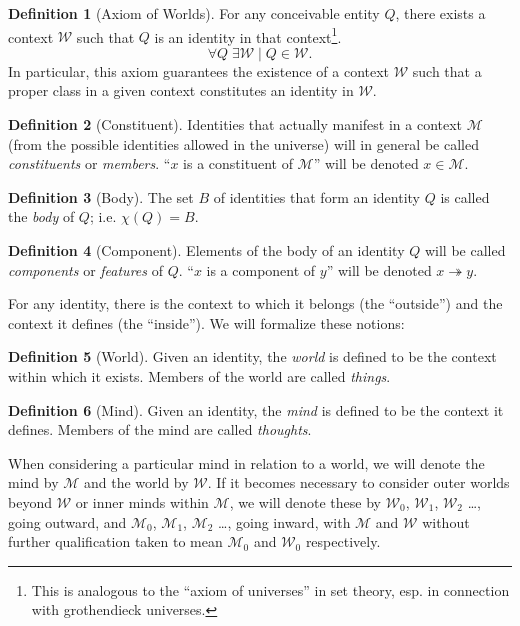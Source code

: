 \documentclass[pra,twocolumn,groupedaddress,10pt]{revtex4}
\theoremstyle{definition}
\newtheorem{defn}{Definition}[section]
\begin{document}
\begin{defn}[Axiom of Worlds]
	For any conceivable entity $Q$, there exists a context $\mathcal{W}$ such that $Q$ is an identity in that context\footnote{This is analogous to the ``axiom of universes''\cite{maclane} in set theory, esp. in connection with grothendieck universes.}.
	\begin{equation}
		\forall Q \; \exists \mathcal{W} \mid Q \in \mathcal{W}. \nonumber
	\end{equation}
	In particular, this axiom guarantees the existence of a context $\mathcal{W}$ such that a proper class in a given context constitutes an identity in $\mathcal{W}$.
\end{defn}

\begin{defn}[Constituent]
	Identities that actually manifest in a context $\mathcal{M}$ (from the possible identities allowed in the universe) will in general be called \emph{constituents} or \emph{members}. ``$x$ is a constituent of $\mathcal{M}$'' will be denoted $x \in \mathcal{M}$.
\end{defn}

\begin{defn}[Body]
	The set $B$ of identities that form an identity $Q$ is called the \emph{body} of $Q$; i.e. $\chi(Q) = B$.
\end{defn}

\begin{defn}[Component]
	Elements of the body of an identity $Q$ will be called \emph{components} or \emph{features} of $Q$. ``$x$ is a component of $y$'' will be denoted $x \twoheadrightarrow y$.
\end{defn}

For any identity, there is the context to which it belongs (the ``outside'') and the context it defines (the ``inside''). We will formalize these notions:

\begin{defn}[World]
	Given an identity, the \emph{world} is defined to be the context within which it exists. Members of the world are called \emph{things}.
\end{defn}

\begin{defn}[Mind]
	Given an identity, the \emph{mind} is defined to be the context it defines. Members of the mind are called \emph{thoughts}.
\end{defn}

When considering a particular mind in relation to a world, we will denote the mind by $\mathcal{M}$ and the world by $\mathcal{W}$. If it becomes necessary to consider outer worlds beyond $\mathcal{W}$ or inner minds within $\mathcal{M}$, we will denote these by $\mathcal{W}_0$, $\mathcal{W}_1$, $\mathcal{W}_2$ \ldots, going outward, and $\mathcal{M}_0$, $\mathcal{M}_1$, $\mathcal{M}_2$ \ldots, going inward, with $\mathcal{M}$ and $\mathcal{W}$ without further qualification taken to mean $\mathcal{M}_0$ and $\mathcal{W}_0$ respectively.
\end{document}
